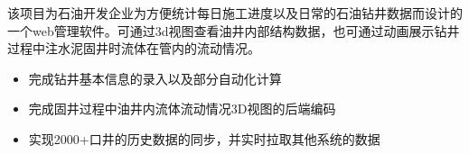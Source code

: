 \documentclass{resume}
\begin{document}
\begin{onehalfspacing}
该项目为石油开发企业为方便统计每日施工进度以及日常的石油钻井数据而设计的一个web管理软件。可通过3d视图查看油井内部结构数据，也可通过动画展示钻井过程中注水泥固井时流体在管内的流动情况。
\begin{itemize}
  \item 完成钻井基本信息的录入以及部分自动化计算
  \item 完成固井过程中油井内流体流动情况3D视图的后端编码
  \item 实现2000+口井的历史数据的同步，并实时拉取其他系统的数据
\end{itemize}
\end{onehalfspacing}


%
%
\end{document}
